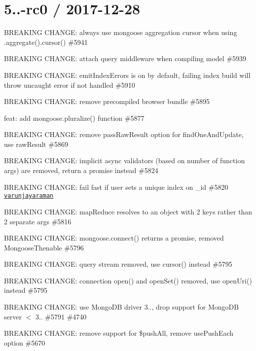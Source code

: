 \section*{5..-\/rc0 / 2017-\/12-\/28 }


\begin{DoxyItemize}
\item B\+R\+E\+A\+K\+I\+NG C\+H\+A\+N\+GE\+: always use mongoose aggregation cursor when using {\ttfamily .aggregate().cursor()} \#5941
\item B\+R\+E\+A\+K\+I\+NG C\+H\+A\+N\+GE\+: attach query middleware when compiling model \#5939
\item B\+R\+E\+A\+K\+I\+NG C\+H\+A\+N\+GE\+: {\ttfamily emit\+Index\+Errors} is on by default, failing index build will throw uncaught error if not handled \#5910
\item B\+R\+E\+A\+K\+I\+NG C\+H\+A\+N\+GE\+: remove precompiled browser bundle \#5895
\item feat\+: add {\ttfamily mongoose.\+pluralize()} function \#5877
\item B\+R\+E\+A\+K\+I\+NG C\+H\+A\+N\+GE\+: remove {\ttfamily pass\+Raw\+Result} option for {\ttfamily find\+One\+And\+Update}, use {\ttfamily raw\+Result} \#5869
\item B\+R\+E\+A\+K\+I\+NG C\+H\+A\+N\+GE\+: implicit async validators (based on number of function args) are removed, return a promise instead \#5824
\item B\+R\+E\+A\+K\+I\+NG C\+H\+A\+N\+GE\+: fail fast if user sets a unique index on {\ttfamily \+\_\+id} \#5820 \href{https://github.com/varunjayaraman}{\tt varunjayaraman}
\item B\+R\+E\+A\+K\+I\+NG C\+H\+A\+N\+GE\+: map\+Reduce resolves to an object with 2 keys rather than 2 separate args \#5816
\item B\+R\+E\+A\+K\+I\+NG C\+H\+A\+N\+GE\+: {\ttfamily mongoose.\+connect()} returns a promise, removed Mongoose\+Thenable \#5796
\item B\+R\+E\+A\+K\+I\+NG C\+H\+A\+N\+GE\+: query stream removed, use {\ttfamily cursor()} instead \#5795
\item B\+R\+E\+A\+K\+I\+NG C\+H\+A\+N\+GE\+: connection {\ttfamily open()} and {\ttfamily open\+Set()} removed, use {\ttfamily open\+Uri()} instead \#5795
\item B\+R\+E\+A\+K\+I\+NG C\+H\+A\+N\+GE\+: use Mongo\+DB driver 3.., drop support for Mongo\+DB server $<$ 3.. \#5791 \#4740
\item B\+R\+E\+A\+K\+I\+NG C\+H\+A\+N\+GE\+: remove support for {\ttfamily \$push\+All}, remove {\ttfamily use\+Push\+Each} option \#5670

\end{DoxyItemize}
